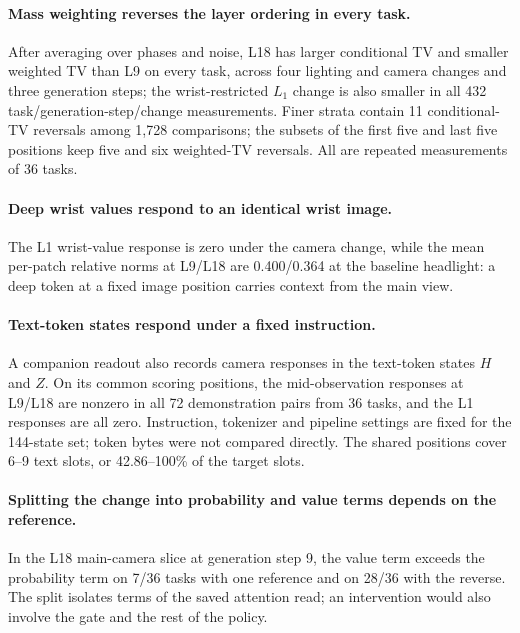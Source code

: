 \paragraph{Mass weighting reverses the layer ordering in every task.}
After averaging over phases and noise, L18 has larger conditional TV and smaller weighted TV than L9 on every task, across four lighting and camera changes and three generation steps; the wrist-restricted $L_1$ change is also smaller in all 432 task/generation-step/change measurements. Finer strata contain 11 conditional-TV reversals among 1,728 comparisons; the subsets of the first five and last five positions keep five and six weighted-TV reversals. All are repeated measurements of 36 tasks.

\paragraph{Deep wrist values respond to an identical wrist image.}
The L1 wrist-value response is zero under the camera change, while the mean per-patch relative norms at L9/L18 are 0.400/0.364 at the baseline headlight: a deep token at a fixed image position carries context from the main view.

\paragraph{Text-token states respond under a fixed instruction.}
A companion readout also records camera responses in the text-token states $H$ and $Z$. On its common scoring positions, the mid-observation responses at L9/L18 are nonzero in all 72 demonstration pairs from 36 tasks, and the L1 responses are all zero. Instruction, tokenizer and pipeline settings are fixed for the 144-state set; token bytes were not compared directly. The shared positions cover 6--9 text slots, or 42.86--100\% of the target slots.

\paragraph{Splitting the change into probability and value terms depends on the reference.}
In the L18 main-camera slice at generation step 9, the value term exceeds the probability term on 7/36 tasks with one reference and on 28/36 with the reverse. The split isolates terms of the saved attention read; an intervention would also involve the gate and the rest of the policy.
